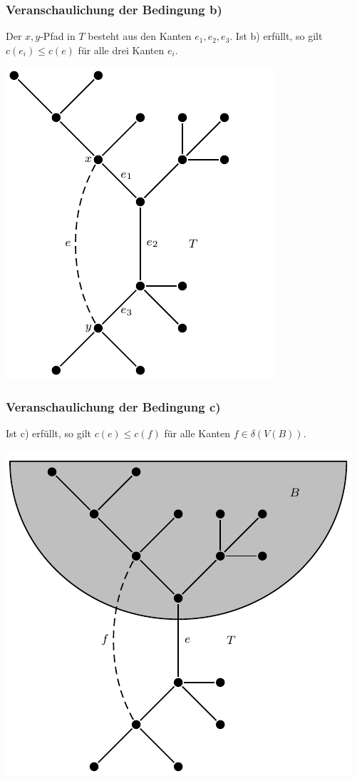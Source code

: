\documentclass[smaller]{beamer}
\begin{document}
\begin{frame}
\frametitle{Veranschaulichung der Bedingung b)}
 Der $x,y$-Pfad in $T$ besteht aus den Kanten $e_1,e_2,e_3$. Ist b) erfüllt, so gilt $c(e_i) \leq c(e)$ für alle drei Kanten $e_i$.

\begin{center}
\includegraphics[scale=0.85]{fig83.pdf}
\end{center}
\end{frame}

\begin{frame}
\frametitle{Veranschaulichung der Bedingung c)}
Ist c) erfüllt, so gilt $c(e) \leq c(f)$ für alle Kanten $f \in \delta(V(B))$.

\begin{center}
 \includegraphics[scale = 0.85]{fig84.pdf}
\end{center}

\end{frame}
\end{document}
